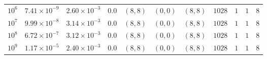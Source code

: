 \begin{tabular}{l c c c c c c c c c c}
    $10^6$  &  $7.41 \times 10^{-9}$  &  $2.60\times 10^{-3}$  &  $0.0$  &  $(8, 8)$  &  $(0, 0)$  &  $(8, 8)$  &  $1028$  &  $1$  &  $1$  &  $8$\\ 
    $10^7$  &  $9.99 \times 10^{-8}$  &  $3.14\times 10^{-3}$  &  $0.0$  &  $(8, 8)$  &  $(0, 0)$  &  $(8, 8)$  &  $1028$  &  $1$  &  $1$  &  $8$\\ 
    $10^8$  &  $6.72 \times 10^{-7}$  &  $3.12\times 10^{-3}$  &  $0.0$  &  $(8, 8)$  &  $(0, 0)$  &  $(8, 8)$  &  $1028$  &  $1$  &  $1$  &  $8$\\ 
    $10^9$  &  $1.17 \times 10^{-5}$  &  $2.40\times 10^{-3}$  &  $0.0$  &  $(8, 8)$  &  $(0, 0)$  &  $(8, 8)$  &  $1028$  &  $1$  &  $1$  &  $8$\\ 
\hline \hline
\end{tabular}
